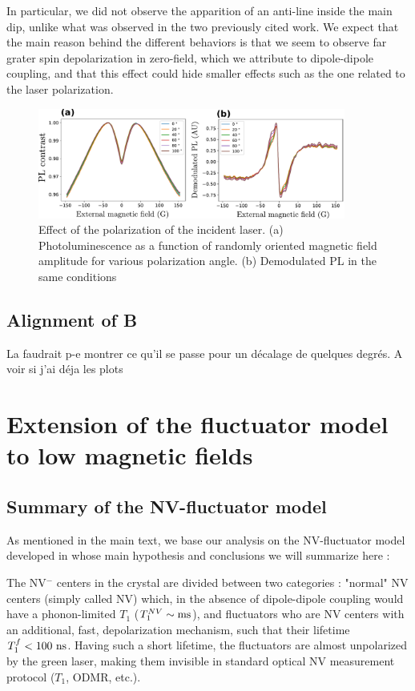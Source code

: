 \documentclass[preprintnumbers,amsmath,amssymb,onecolumn,12pt]{revtex4-2}
\begin{document}
In particular, we did not observe the apparition of an anti-line inside the main dip, unlike what was observed in the two previously cited work. We expect that the main reason behind the different behaviors is that we seem to observe far grater spin depolarization in zero-field, which we attribute to dipole-dipole coupling, and that this effect could hide smaller effects such as the one related to the laser polarization.
\begin{figure}
\includegraphics[width=0.9\textwidth]{Figures_SI/fig_Pola}
\caption{Effect of the polarization of the incident laser. (a) Photoluminescence as a function of randomly oriented magnetic field amplitude for various polarization angle. (b) Demodulated PL in the same conditions}
\label{Pola}
\end{figure}
\subsection{Alignment of B}
La faudrait p-e montrer ce qu'il se passe pour un décalage de quelques degrés. A voir si j'ai déja les plots
\section{Extension of the fluctuator model to low magnetic fields}
\subsection{Summary of the NV-fluctuator model}
As mentioned in the main text, we base our analysis on the NV-fluctuator model developed in \cite{choi_depolarization_2017} whose main hypothesis and conclusions we will summarize here :

The NV$^-$ centers in the crystal are divided between two categories : "normal" NV centers (simply called NV) which, in the absence of dipole-dipole coupling would have a phonon-limited $T_1$ ($T_1^{NV}\sim \rm ms$), and fluctuators who are NV centers with an additional, fast, depolarization mechanism, such that their lifetime $T_1^f < 100\ \rm ns$. Having such a short lifetime, the fluctuators are almost unpolarized by the green laser, making them invisible in standard optical NV measurement protocol ($T_1$, ODMR, etc.). 
\end{document}
